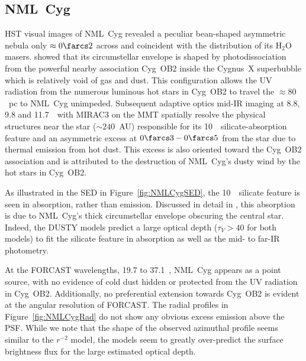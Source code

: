 \documentclass[modern]{aastex61}
\begin{document}




\subsection{NML~Cyg}\label{sec:nmlcyg}
HST visual images of NML~Cyg revealed a peculiar bean-shaped asymmetric nebula only $\approx0\farcs2$ across and coincident with the distribution of its H$_{2}$O masers. \citet{schuster2006} showed that its circumstellar envelope is shaped by photodissociation from the powerful nearby association Cyg~OB2 inside the Cygnus~X superbubble which is relatively void of gas and dust.  This configuration allows the UV radiation from the numerous luminous hot stars in Cyg~OB2 to travel the $\approx80$~pc to NML~Cyg unimpeded.   Subsequent adaptive optics mid-IR imaging at 8.8, 9.8 and 11.7~\micron\ with MIRAC3 on the MMT \citep{schuster2009} spatially resolve the physical structures near the star ($\sim240$~AU) responsible for its 10~\micron\ silicate-absorption feature and an asymmetric excess at $0\farcs3 - 0\farcs5$ from the star due to thermal emission from hot dust. This excess is also oriented toward the Cyg~OB2 association and is attributed to the destruction of NML~Cyg's dusty wind by the hot stars in Cyg~OB2.

As illustrated in the SED in Figure~\ref{fig:NMLCygSED}, the 10~\micron\ silicate feature is seen in absorption, rather than emission.  Discussed in detail in \cite{schuster2006,schuster2009}, this absorption is due to NML~Cyg's thick circumstellar envelope obscuring the central star.  Indeed, the DUSTY models predict a large optical depth ($\tau_V>40$ for both models) to fit the silicate feature in absorption as well as the mid- to far-IR photometry.

At the FORCAST wavelengths, 19.7 to 37.1~\micron, NML~Cyg appears as a point source, with no evidence of cold dust hidden or protected from the UV radiation in Cyg~OB2.  Additionally, no preferential extension towards Cyg~OB2 is evident at the angular resolution of FORCAST.  The radial profiles in Figure~\ref{fig:NMLCygRad} do not show any obvious excess emission above the PSF. While we note that the shape of the observed azimuthal profile seems similar to the $r^{-2}$ model, the models seem to greatly over-predict the surface brightness flux for the large estimated optical depth.
\end{document}
